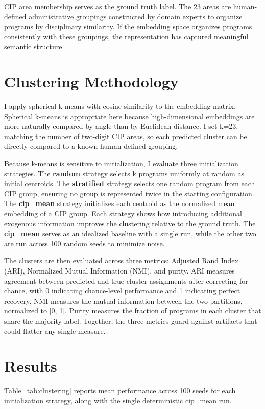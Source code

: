 CIP area membership serves as the ground truth label. The 23 areas are human-defined administrative groupings constructed by domain experts to organize programs by disciplinary similarity. If the embedding space organizes programs consistently with these groupings, the representation has captured meaningful semantic structure.

\section{Clustering Methodology}

I apply spherical k-means with cosine similarity to the embedding matrix. Spherical k-means is appropriate here because high-dimensional embeddings are more naturally compared by angle than by Euclidean distance. I set k=23, matching the number of two-digit CIP areas, so each predicted cluster can be directly compared to a known human-defined grouping.

Because k-means is sensitive to initialization, I evaluate three initialization strategies. The \textbf{random} strategy selects k programs uniformly at random as initial centroids. The \textbf{stratified} strategy selects one random program from each CIP group, ensuring no group is represented twice in the starting configuration. The \textbf{cip\_mean} strategy initializes each centroid as the normalized mean embedding of a CIP group. Each strategy shows how introducing additional exogenous information improves the clustering relative to the ground truth. The \textbf{cip\_mean} serves as an idealized baseline with a single run, while the other two are run across 100 random seeds to minimize noise.

The clusters are then evaluated across three metrics: Adjusted Rand Index (ARI), Normalized Mutual Information (NMI), and purity. ARI measures agreement between predicted and true cluster assignments after correcting for chance, with 0 indicating chance-level performance and 1 indicating perfect recovery. NMI measures the mutual information between the two partitions, normalized to [0, 1]. Purity measures the fraction of programs in each cluster that share the majority label. Together, the three metrics guard against artifacts that could flatter any single measure.

\section{Results}

Table~\ref{tab:clustering} reports mean performance across 100 seeds for each initialization strategy, along with the single deterministic cip\_mean run.

